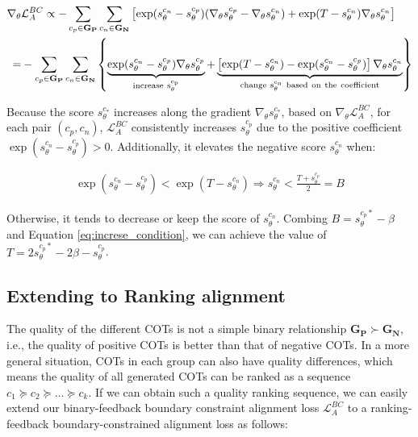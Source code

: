 \begin{equation}
\begin{aligned}
      \nabla_{\theta}& \mathcal{L}_A^{BC} \propto - \sum_{c_p \in \mathbf{G_P}}\sum_{c_n \in \mathbf{G_N}} \left[ \exp(s_{\theta}^{c_n} - s_{\theta}^{c_p})(\nabla_{\theta}s_{\theta}^{c_p} -
     \nabla_{\theta}s_{\theta}^{c_n}) +  \exp(T - s_{\theta}^{c_n})\nabla_{\theta}s_{\theta}^{c_n} \right] \\
     =&-\sum_{c_p \in \mathbf{G_P}}\sum_{c_n \in \mathbf{G_N}} \left\{\underbrace{\exp(s_{\theta}^{c_n} - s_{\theta}^{c_p})\nabla_{\theta}s_{\theta}^{c_p}}_{\rm increase \ s_{\theta}^{c_p}} + \underbrace{ \left[\exp(T - s_{\theta}^{c_n}) -\exp(s_{\theta}^{c_n} - s_{\theta}^{c_p})\right] \nabla_{\theta}s_{\theta}^{c_n}}_{\rm change \ s_{\theta}^{c_n} \ based \ on \ the \ coefficient}\right\}
     \label{eq: gradient}
\end{aligned}
\end{equation}

Because the score $s_\theta^{c_*}$ increases along the gradient $\nabla_{\theta}s_{\theta}^{c_*}$,
based on $\nabla_{\theta} \mathcal{L}_A^{BC}$, for each pair $(c_p, c_n)$, $\mathcal{L}_A^{BC}$ consistently increases $s_\theta^{c_p}$ due to the positive coefficient $\exp(s_{\theta}^{c_n} - s_{\theta}^{c_p} ) > 0$. Additionally, it elevates the negative score
$s_{\theta}^{c_n}$ when:

\begin{equation}
    \begin{split}
     \exp(s_{\theta}^{c_n} - s_{\theta}^{c_p})  < \exp(T - s_{\theta}^{c_n})
    \Rightarrow s_{\theta}^{c_n} < \frac{T+s_{\theta}^{c_p}}{2} = B
    \label{eq:increse_condition}
    \end{split}
\end{equation}

Otherwise, it tends to decrease or keep the score of $s_{\theta}^{c_n}$. Combing $B = s_{\theta}^{c_p*} - \beta$ and Equation \ref{eq:increse_condition}, we can achieve the value of $T=2s_{\theta}^{c_p*}-2\beta-s_{\theta}^{c_p}$. 

\subsection{Extending to Ranking alignment}
\label{sec: ranking} The quality of the different COTs is not a simple binary relationship $\mathbf{G_P} \succ \mathbf{G_N}$, i.e., the quality of positive COTs is better than that of negative COTs. In a more general situation, COTs in each group can also have quality differences, which means the quality of all generated COTs can be ranked as a sequence $c_1 \succeq c_2 \succeq \dots \succeq c_k$. If we can obtain such a quality ranking sequence, we can easily extend our binary-feedback boundary constraint alignment loss $\mathcal{L}_A^{BC}$ to a ranking-feedback boundary-constrained alignment loss as follows:

